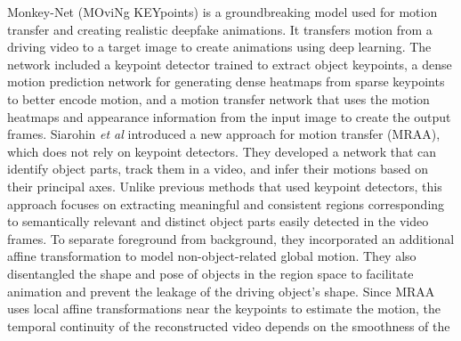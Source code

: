 Monkey-Net (MOviNg KEYpoints) \cite{siarohin2019animating} is a groundbreaking model used for motion transfer and creating realistic deepfake animations. It transfers motion from a driving video to a target image to create animations using deep learning. The network included a keypoint detector trained to extract object keypoints, a dense motion prediction network for generating dense heatmaps from sparse keypoints to better encode motion, and a motion transfer network that uses the motion heatmaps and appearance information from the input image to create the output frames. Siarohin \textit{et al} \cite{siarohin2021motion} introduced a new approach for motion transfer (MRAA), which does not rely on keypoint detectors. They developed a network that can identify object parts, track them in a video, and infer their motions based on their principal axes. Unlike previous methods that used keypoint detectors, this approach focuses on extracting meaningful and consistent regions corresponding to semantically relevant and distinct object parts easily detected in the video frames. To separate foreground from background, they incorporated an additional affine transformation to model non-object-related global motion. They also disentangled the shape and pose of objects in the region space to facilitate animation and prevent the leakage of the driving object's shape. Since MRAA uses local affine transformations near the keypoints to estimate the motion, the temporal continuity of the reconstructed video depends on the smoothness of the
